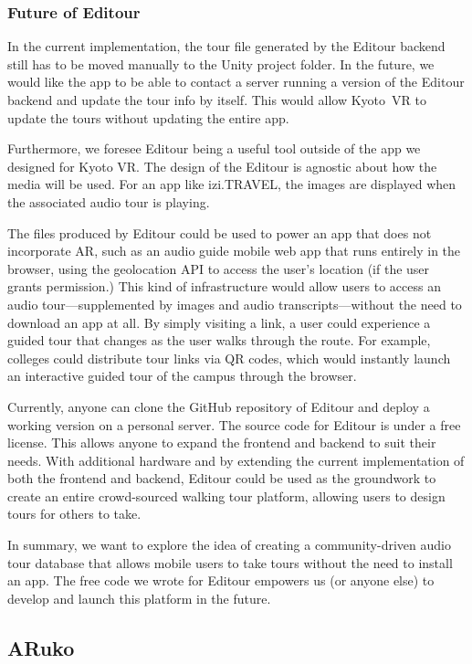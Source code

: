 \documentclass[a4paper, 10pt, american, titlepage]{article}
\begin{document}
\subsubsection{Future of Editour}
\label{sec:futureOfEditour}

In the current implementation, the tour file generated by the Editour backend
still has to be moved manually to the Unity project folder. In the future, we
would like the app to be able to contact a server running a version of the
Editour backend and update the tour info by itself. This would allow Kyoto~VR to
update the tours without updating the entire app.

Furthermore, we foresee Editour being a useful tool outside of the app we
designed for Kyoto VR. The design of the Editour is agnostic about how the media
will be used. For an app like izi.TRAVEL, the images are displayed when the
associated audio tour is playing.

The files produced by Editour could be used to power an app that does not
incorporate AR, such as an audio guide mobile web app that runs entirely in the
browser, using the geolocation API to access the user's location (if the user
grants permission.) This kind of infrastructure would allow users to access an
audio tour---supplemented by images and audio transcripts---without the need to
download an app at all. By simply visiting a link, a user could experience a
guided tour that changes as the user walks through the route. For example,
colleges could distribute tour links via QR codes, which would instantly launch
an interactive guided tour of the campus through the browser.

Currently, anyone can clone the GitHub repository of Editour and deploy a
working version on a personal server. The source code for Editour is under a
free license. This allows anyone to expand the frontend and backend to suit
their needs. With additional hardware and by extending the current
implementation of both the frontend and backend, Editour could be used as the
groundwork to create an entire crowd-sourced walking tour platform, allowing
users to design tours for others to take.

In summary, we want to explore the idea of creating a community-driven audio
tour database that allows mobile users to take tours without the need to install
an app. The free code we wrote for Editour empowers us (or anyone else)
to develop and launch this platform in the future.

\subsection{ARuko}
\label{sec:aruko}
\end{document}

